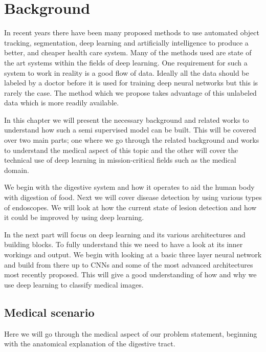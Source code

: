 \documentclass[thesis.tex]{subfiles}
\begin{document}
\chapter{Background} \label{chap:background}
In recent years there have been many proposed methods to use automated object tracking, segmentation, deep learning and artificially intelligence to produce a better, and cheaper health care system. Many of the methods used are state of the art systems within the fields of deep learning. One requirement for such a system to work in reality is a good flow of data. Ideally all the data should be labeled by a doctor before it is used for training deep neural networks but this is rarely the case. The method which we propose takes advantage of this unlabeled data which is more readily available.

In this chapter we will present the necessary background and related works to understand how such a semi supervised model can be built. This will be covered over two main parts; one where we go through the related background and works to understand the medical aspect of this topic and the other will cover the technical use of deep learning in mission-critical fields such as the medical domain.

We begin with the digestive system and how it operates to aid the human body with digestion of food. Next we will cover disease detection by using various types of endoscopes. We will look at how the current state of lesion detection and how it could be improved by using deep learning. 

In the next part will focus on deep learning and its various architectures and building blocks. To fully understand this we need to have a look at its inner workings and output. We begin with looking at a basic three layer neural network and build from there up to CNNs and some of the most advanced architectures most recently proposed. This will give a good understanding of how and why we use deep learning to classify medical images.


\section{Medical scenario} \label{sec:medical_scenario}
Here we will go through the medical aspect of our problem statement, beginning with the anatomical explanation of the digestive tract. 
\end{document}
